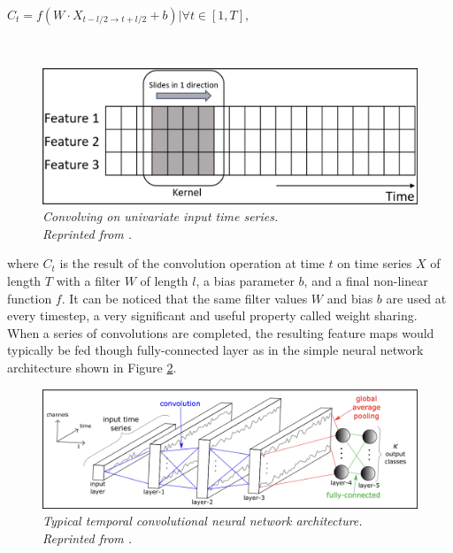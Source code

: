 \hfil $C_t = f(W \cdot X_{t-l/2 \to t+l/2} + b) | \forall t \in [1, T], $ \par \

\begin{figure}[H]
  \centering
  \caption[Convolving on univariate input time series.]{\emph{Convolving on univariate input time series. \\
      Reprinted from \citeauthor{ismail_fawaz_forestier_weber_idoumghar_muller_2019} \citeyear{ismail_fawaz_forestier_weber_idoumghar_muller_2019}.}}\label{fig:CNN}
  \includegraphics[scale = 0.3]{figures/CNN.jpg}
\end{figure}


where $C_t$ is the result of the convolution operation at time $t$ on time series $X$ of length $T$ with a filter $W$ of length $l$, a bias parameter $b$, and a final non-linear function $f$. It can be noticed that the same filter values $W$ and bias $b$ are used at every timestep, a very significant and useful property called weight sharing. When a series of convolutions are completed, the resulting feature maps would typically be fed though fully-connected layer as in the simple neural network architecture shown in Figure \ref{fig:CNN_ts}.

\begin{figure}[H]
  \centering
  \caption[Typical temporal convolutional neural network architecture.]{\emph{Typical temporal convolutional neural network architecture.  \\
      Reprinted from \citeauthor{ismail_fawaz_forestier_weber_idoumghar_muller_2019} \citeyear{ismail_fawaz_forestier_weber_idoumghar_muller_2019}.}}\label{fig:CNN_ts}
  \includegraphics[scale = 0.3]{figures/CNN_ts.jpg}
\end{figure}



